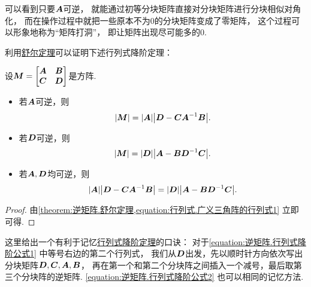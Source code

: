 可以看到只要\(\boldsymbol{A}\)可逆，
就能通过初等分块矩阵直接对分块矩阵进行分块相似对角化，
而在操作过程中就把一些原本不为0的分块矩阵变成了零矩阵，
这个过程可以形象地称为“矩阵打洞”，
即让矩阵出现尽可能多的0.

利用\hyperref[theorem:逆矩阵.舒尔定理]{舒尔定理}可以证明下述行列式降阶定理：
\begin{theorem}[行列式降阶定理]\label{theorem:逆矩阵.行列式降阶定理}
设\(\boldsymbol{M} = \begin{bmatrix}
	\boldsymbol{A} & \boldsymbol{B} \\
	\boldsymbol{C} & \boldsymbol{D}
\end{bmatrix}\)是方阵.
\begin{itemize}
	\item 若\(\boldsymbol{A}\)可逆，则\begin{equation}\label{equation:逆矩阵.行列式降阶公式1}
		\abs{\boldsymbol{M}} = \abs{\boldsymbol{A}} \abs{\boldsymbol{D} - \boldsymbol{C} \boldsymbol{A}^{-1} \boldsymbol{B}}.
	\end{equation}

	\item 若\(\boldsymbol{D}\)可逆，则\begin{equation}\label{equation:逆矩阵.行列式降阶公式2}
		\abs{\boldsymbol{M}} = \abs{\boldsymbol{D}} \abs{\boldsymbol{A} - \boldsymbol{B} \boldsymbol{D}^{-1} \boldsymbol{C}}.
	\end{equation}

	\item 若\(\boldsymbol{A},\boldsymbol{D}\)均可逆，则\begin{equation}
		\abs{\boldsymbol{A}} \abs{\boldsymbol{D} - \boldsymbol{C} \boldsymbol{A}^{-1} \boldsymbol{B}}
		= \abs{\boldsymbol{D}} \abs{\boldsymbol{A} - \boldsymbol{B} \boldsymbol{D}^{-1} \boldsymbol{C}}.
	\end{equation}
\end{itemize}
\begin{proof}
由\cref{theorem:逆矩阵.舒尔定理,equation:行列式.广义三角阵的行列式1} 立即可得.
\end{proof}
\end{theorem}
\begin{remark}
这里给出一个有利于记忆\hyperref[theorem:逆矩阵.行列式降阶定理]{行列式降阶定理}的口诀：
对于\cref{equation:逆矩阵.行列式降阶公式1} 中等号右边的第二个行列式，
我们从\(\boldsymbol{D}\)出发，先以顺时针方向依次写出分块矩阵\(\boldsymbol{D},\boldsymbol{C},\boldsymbol{A},\boldsymbol{B}\)，
再在第一个和第二个分块阵之间插入一个减号，最后取第三个分块阵的逆矩阵.
\cref{equation:逆矩阵.行列式降阶公式2} 也可以相同的记忆方法.
\end{remark}

